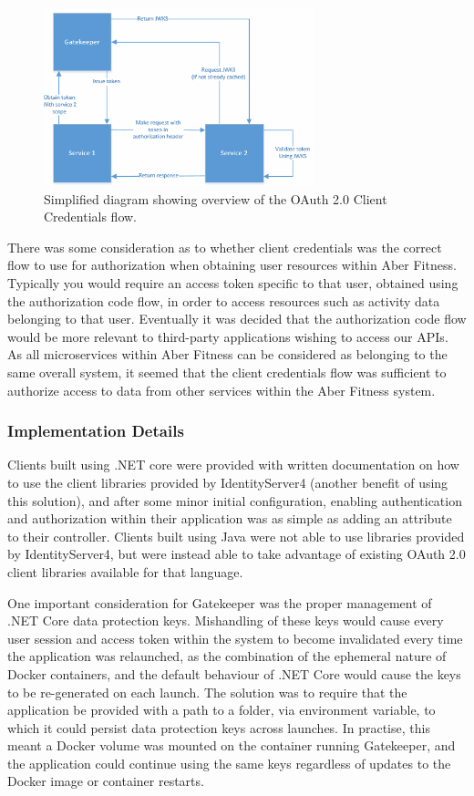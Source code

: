 \begin{figure}[H]
    \centering
    \includegraphics[width=0.7\textwidth]{Images/gatekeeper_clientcredentials_flow.png}
    \caption{Simplified diagram showing overview of the OAuth 2.0 Client Credentials flow.}
\end{figure}

There was some consideration as to whether client credentials was the correct flow to use for authorization when obtaining user resources within Aber Fitness. Typically you would require an access token specific to that user, obtained using the authorization code flow, in order to access resources such as activity data belonging to that user. Eventually it was decided that the authorization code flow would be more relevant to third-party applications wishing to access our APIs. As all microservices within Aber Fitness can be considered as belonging to the same overall system, it seemed that the client credentials flow was sufficient to authorize access to data from other services within the Aber Fitness system.

\subsubsection{Implementation Details}

Clients built using .NET core were provided with written documentation on how to use the client libraries provided by IdentityServer4 (another benefit of using this solution), and after some minor initial configuration, enabling authentication and authorization within their application was as simple as adding an attribute to their controller. Clients built using Java were not able to use libraries provided by IdentityServer4, but were instead able to take advantage of existing OAuth 2.0 client libraries available for that language.

One important consideration for Gatekeeper was the proper management of .NET Core data protection keys. Mishandling of these keys would cause every user session and access token within the system to become invalidated every time the application was relaunched, as the combination of the ephemeral nature of Docker containers, and the default behaviour of .NET Core would cause the keys to be re-generated on each launch. The solution was to require that the application be provided with a path to a folder, via environment variable, to which it could persist data protection keys across launches. In practise, this meant a Docker volume was mounted on the container running Gatekeeper, and the application could continue using the same keys regardless of updates to the Docker image or container restarts.

